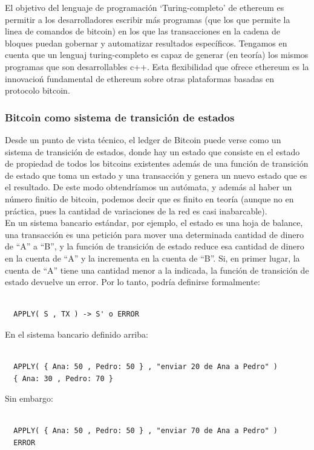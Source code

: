 \documentclass[11pt,a4paper]{article}
\begin{document}
El objetivo del lenguaje de programación ‘Turing-completo’ de ethereum es permitir a los
desarrolladores escribir más programas (que los que permite la linea de comandos de bitcoin) en los que las transacciones en la cadena de bloques puedan gobernar y automatizar resultados específicos. Tengamos en cuenta que un lenguaj turing-completo es capaz de generar (en teoría) los mismos programas que son desarrollables c++. Esta flexibilidad que ofrece ethereum es  la innovacioń fundamental de ethereum sobre otras plataformas basadas en protocolo bitcoin.\\

\subsubsection{Bitcoin como sistema de transición de estados}

Desde un punto de vista técnico, el ledger de Bitcoin puede verse como un sistema de
transición de estados, donde hay un estado que consiste en el estado de propiedad de todos los bitcoins existentes además de una función de transición de estado que toma un estado y una transacción y genera un nuevo estado que es el resultado. De este modo obtendríamos un autómata, y además al haber un número finitio de bitcoin, podemos decir que es finito en teoría (aunque no en práctica, pues la cantidad de variaciones de la red es casi inabarcable).\\

En un sistema bancario estándar, por ejemplo, el estado es una hoja de balance, una transacción es una petición para mover una determinada cantidad de dinero de “A” a “B”, y la función de transición de estado reduce esa cantidad de dinero en la cuenta de “A” y la incrementa en la cuenta de “B”. Si, en primer lugar, la cuenta de “A” tiene una cantidad menor a la indicada, la función de transición de estado devuelve un error. Por lo tanto, podría definirse formalmente:
\begin{lstlisting}

  APPLY( S , TX ) -> S' o ERROR

\end{lstlisting}


En el sistema bancario definido arriba:
\begin{lstlisting}

  APPLY( { Ana: 50 , Pedro: 50 } , "enviar 20 de Ana a Pedro" ) 
  { Ana: 30 , Pedro: 70 }

\end{lstlisting}
Sin embargo:
\begin{lstlisting}

  APPLY( { Ana: 50 , Pedro: 50 } , "enviar 70 de Ana a Pedro" ) 
  ERROR

\end{lstlisting}
\end{document}
